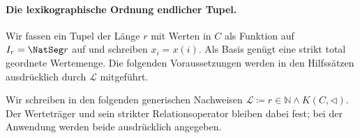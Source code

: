 \paragraph{Die lexikographische Ordnung endlicher Tupel.}
Wir fassen ein Tupel der Länge \(r\) mit Werten in \(C\) als Funktion
auf \(I_r=\NatSeg r\) auf und schreiben \(x_i=x(i)\). Als Basis genügt
eine strikt total geordnete Wertemenge. Die folgenden Voraussetzungen
werden in den Hilfssätzen ausdrücklich durch \(\mathcal L\) mitgeführt.

Wir schreiben in den folgenden generischen Nachweisen
\(\mathcal L\coloneqq r\in\mathbb N\land K(C,\triangleleft)\).
Der Werteträger und sein strikter Relationsoperator bleiben dabei fest;
bei der Anwendung werden beide ausdrücklich angegeben.

